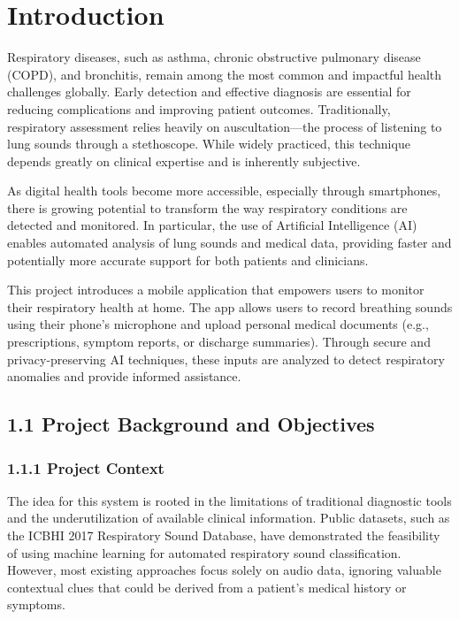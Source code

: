 \section*{Introduction}

Respiratory diseases, such as asthma, chronic obstructive pulmonary disease (COPD), and bronchitis, remain among the most common and impactful health challenges globally. Early detection and effective diagnosis are essential for reducing complications and improving patient outcomes. Traditionally, respiratory assessment relies heavily on auscultation—the process of listening to lung sounds through a stethoscope. While widely practiced, this technique depends greatly on clinical expertise and is inherently subjective.

As digital health tools become more accessible, especially through smartphones, there is growing potential to transform the way respiratory conditions are detected and monitored. In particular, the use of Artificial Intelligence (AI) enables automated analysis of lung sounds and medical data, providing faster and potentially more accurate support for both patients and clinicians.

This project introduces a mobile application that empowers users to monitor their respiratory health at home. The app allows users to record breathing sounds using their phone’s microphone and upload personal medical documents (e.g., prescriptions, symptom reports, or discharge summaries). Through secure and privacy-preserving AI techniques, these inputs are analyzed to detect respiratory anomalies and provide informed assistance.

\subsection*{1.1 Project Background and Objectives}

\subsubsection*{1.1.1 Project Context}

The idea for this system is rooted in the limitations of traditional diagnostic tools and the underutilization of available clinical information. Public datasets, such as the ICBHI 2017 Respiratory Sound Database, have demonstrated the feasibility of using machine learning for automated respiratory sound classification. However, most existing approaches focus solely on audio data, ignoring valuable contextual clues that could be derived from a patient's medical history or symptoms.

